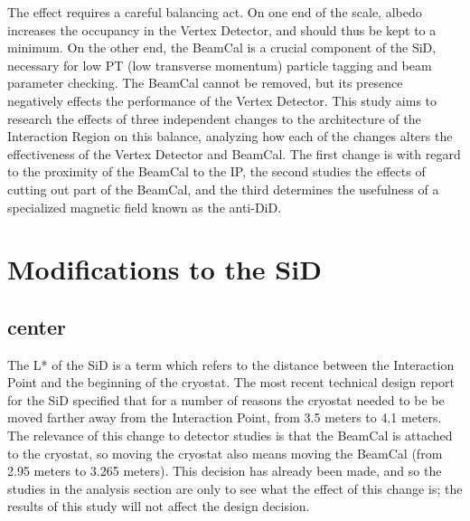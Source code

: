 \documentclass{report}
\begin{document}
                The effect requires a careful balancing act. On one end of the scale, albedo increases the occupancy in the Vertex Detector, and should thus be kept to a minimum. On the other end, the BeamCal is a crucial component of the SiD, necessary for low PT (low transverse momentum) particle tagging and beam parameter checking. The BeamCal cannot be removed, but its presence negatively effects the performance of the Vertex Detector. This study aims to research the effects of three independent changes to the architecture of the Interaction Region on this balance, analyzing how each of the changes alters the effectiveness of the Vertex Detector and BeamCal. The first change is with regard to the proximity of the BeamCal to the IP, the second studies the effects of cutting out part of the BeamCal, and the third determines the usefulness of a specialized magnetic field known as the anti-DiD.


        \section{Modifications to the SiD}
            \subsection{center}

                The L* of the SiD is a term which refers to the distance between the Interaction Point and the beginning of the cryostat. The most recent technical design report for the SiD specified that for a number of reasons the cryostat needed to be be moved farther away from the Interaction Point, from 3.5 meters to 4.1 meters. The relevance of this change to detector studies is that the BeamCal is attached to the cryostat, so moving the cryostat also means moving the BeamCal (from 2.95 meters to 3.265 meters). This decision has already been made, and so the studies in the analysis section are only to see what the effect of this change is; the results of this study will not affect the design decision.
\end{document}
